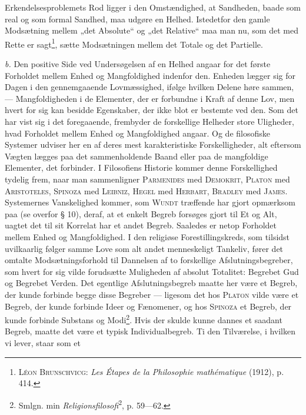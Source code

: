 \documentclass[12pt]{article}
\newcommand{\opage}[1]{\marginnote{\footnotesize\textit{[#1]}}}
\begin{document}
Erkendelsesproblemets Rod ligger i den Omstændighed, at Sandheden, baade som
real og som formal Sandhed, maa udgøre en Helhed. Istedetfor den gamle
\setcounter{footnote}{0}%
\opage{77}Modsætning mellem „det Absolute“ og „det Relative“ maa man nu, som det
med Rette er sagt\footnote{\textsc{Léon Brunschvicg}: \textit{Les Étapes de la
Philosophie mathématique} (1912), p. 414.}, sætte Modsætningen mellem det Totale
og det Partielle.

\textit{b.} Den positive Side ved Undersøgelsen af en Helhed angaar for det
første Forholdet mellem Enhed og Mangfoldighed indenfor den. Enheden lægger sig
for Dagen i den gennemgaaende Lovmæssighed, ifølge hvilken Delene høre sammen,
--- Mangfoldigheden i de Elementer, der er forbundne i Kraft af denne Lov, men
hvert for sig kan besidde Egenskaber, der ikke blot er bestemte ved den. Som det
har vist sig i det foregaaende, frembyder de forskellige Helheder store
Uligheder, hvad Forholdet mellem Enhed og Mangfoldighed angaar. Og de filosofiske
Systemer udviser her en af deres mest karakteristiske Forskelligheder, alt
eftersom Vægten lægges paa det sammenholdende Baand eller paa de mangfoldige
Elementer, det forbinder. I Filosofiens Historie kommer denne Forskellighed
tydelig frem, naar man sammenligner \textsc{Parmenides} med \textsc{Demokrit},
\textsc{Platon} med \textsc{Aristoteles}, \textsc{Spinoza} med \textsc{Leibniz},
\textsc{Hegel} med \textsc{Herbart}, \textsc{Bradley} med \textsc{James}.
Systemernes Vanskelighed kommer, som \textsc{Wundt} træffende har gjort
opmærksom paa (se overfor § 10), deraf, at et enkelt Begreb forsøges gjort til
Et og Alt, uagtet det til sit Korrelat har et andet Begreb. Saaledes er netop
Forholdet mellem Enhed og Mangfoldighed. I den religiøse Forestillingskreds, som
tilsidst uvilkaarlig følger samme Love som alt andet menneskeligt Tankeliv, fører
det omtalte Modsætningsforhold til Dannelsen af to forskellige
Afslutningsbegreber, som hvert for sig vilde forudsætte Muligheden af absolut
Totalitet: Begrebet Gud og Begrebet Verden. Det egentlige Afslutningsbegreb
maatte her være et Begreb, der kunde forbinde begge disse Begreber --- ligesom
det hos \textsc{Platon} vilde være et Begreb, der kunde forbinde Ideer og
Fænomener, og hos \textsc{Spinoza} et Begreb, der kunde forbinde Substans og
Modi\footnote{Smlgn. min \textit{Religionsfilosofi}\textsuperscript{2}, p.
59---62.}. Hvis der skulde kunne dannes et saadant Begreb, maatte det være et
typisk Individualbegreb. Ti den Tilværelse, i hvilken vi lever, staar som et
\end{document}
